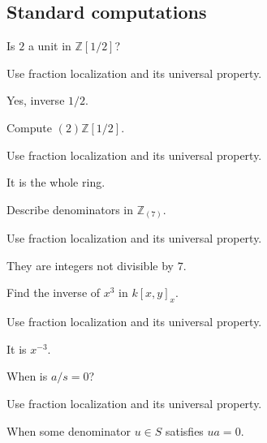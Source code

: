 \subsection*{Standard computations}

\begin{exercise}[Unit]\label{exr:v06-expand-01}
Is $2$ a unit in $\mathbb Z[1/2]$?
\end{exercise}
\begin{hint}
Use fraction localization and its universal property.
\end{hint}
\begin{solution}
Yes, inverse $1/2$.
\end{solution}

\begin{exercise}\label{exr:v06-expand-02}
Compute $(2)\mathbb Z[1/2]$.
\end{exercise}
\begin{hint}
Use fraction localization and its universal property.
\end{hint}
\begin{solution}
It is the whole ring.
\end{solution}

\begin{exercise}\label{exr:v06-expand-03}
Describe denominators in $\mathbb Z_{(7)}$.
\end{exercise}
\begin{hint}
Use fraction localization and its universal property.
\end{hint}
\begin{solution}
They are integers not divisible by $7$.
\end{solution}

\begin{exercise}\label{exr:v06-expand-04}
Find the inverse of $x^3$ in $k[x,y]_x$.
\end{exercise}
\begin{hint}
Use fraction localization and its universal property.
\end{hint}
\begin{solution}
It is $x^{-3}$.
\end{solution}

\begin{exercise}\label{exr:v06-expand-05}
When is $a/s=0$?
\end{exercise}
\begin{hint}
Use fraction localization and its universal property.
\end{hint}
\begin{solution}
When some denominator $u\in S$ satisfies $ua=0$.
\end{solution}

